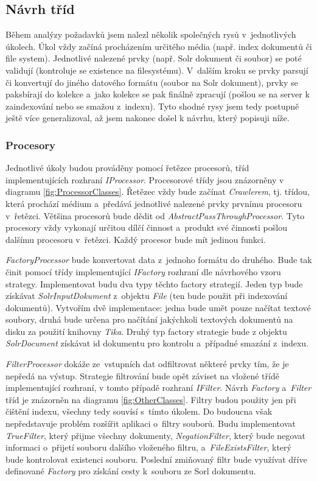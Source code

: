 \subsection{Návrh tříd}
Během analýzy požadavků jsem nalezl několik společných rysů v~jednotlivých úkolech. Úkol vždy začíná procházením určitého média (např. index dokumentů či file system). Jednotlivé nalezené prvky (např. Solr dokument či soubor) se poté validují (kontroluje se existence na filesystému). V~dalším kroku se prvky parsují či konvertují do jiného datového formátu (soubor na Solr dokument), prvky se paksbírají do kolekce a~jako kolekce se pak finálně zpracují (pošlou se na server k zaindexování nebo se smažou z~indexu). Tyto shodné rysy jsem tedy postupně ještě více generalizoval, až jsem nakonec došel k návrhu, který popisuji níže.

\subsubsection{Procesory}
Jednotlivé úkoly budou prováděny pomocí řetězce procesorů, tříd implementujících rozhraní \emph{IProcessor}.  Procesorové třídy jsou znázorněny v diagramu \ref{fig:ProcessorClasses}. Řetězec vždy bude začínat \emph{Crawlerem}, tj. třídou, která prochází médium a~předává jednotlivé nalezené prvky prvnímu procesoru v~řetězci. Většina procesorů bude dědit od \emph{AbstractPassThroughProcessor}. Tyto procesory vždy vykonají určitou dílčí činnost a~produkt své činnosti pošlou dalšímu procesoru v~řetězci. Každý procesor bude mít jedinou funkci.

\emph{FactoryProcessor} bude konvertovat data z~jednoho formátu do druhého. Bude tak činit pomocí třídy implementující \emph{IFactory} rozhraní dle návrhového vzoru strategy. Implementovat budu dva typy těchto factory strategií. Jeden typ bude získávat \emph{SolrInputDokument} z~objektu \emph{File} (ten bude použit při indexování dokumentů). Vytvořím dvě implementace: jedna bude umět pouze načítat textové soubory, druhá bude určena pro načítání jakýchkoli textových dokumentů na disku za použití knihovny \emph{Tika}. Druhý typ factory strategie bude z objektu \emph{SolrDocument} získávat id dokumentu pro kontrolu a~případné smazání z~indexu.

\emph{FilterProcessor} dokáže ze~vstupních dat odfiltrovat některé prvky tím, že je nepředá na výstup. Strategie filtrování bude opět záviset na vložené třídě implementující rozhraní, v tomto případě rozhraní \emph{IFilter}. Návrh \emph{Factory} a~\emph{Filter} tříd je znázorněn na diagramu \ref{fig:OtherClasses}. Filtry budou použity jen při čištění indexu, všechny tedy souvísí s~tímto úkolem. Do budoucna však nepředstavuje problém rozšířit aplikaci o~filtry souborů. Budu implementovat \emph{TrueFilter}, který přijme všechny dokumenty, \emph{NegationFilter}, který bude negovat informaci o~přijetí souboru dalšího vloženého filtru, a~\emph{FileExistsFilter}, který bude kontrolovat existenci souboru. Poslední zmiňovaný filtr bude využívat dříve definované \emph{Factory} pro získání cesty k~souboru ze Sorl dokumentu.

